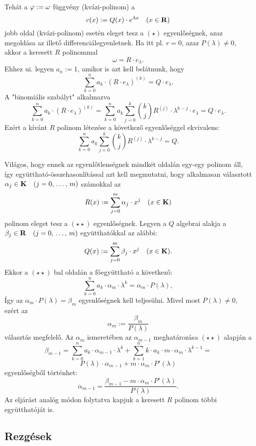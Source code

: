 Tehát  a $\varphi := \omega$ függvény (kvázi-polinom) a
\[
	 c(x) := Q(x) \cdot e^{\lambda x} \quad (x \in \mathbf{R})
\]
jobb oldal (kvázi-polinom) esetén eleget tesz a $(\star)$ egyenlőségnek, azaz megoldása az illető differenciálegyenletnek. Ha itt pl. $r=0$, azaz $P(\lambda) \neq 0$, akkor a keresett $R$ polinommal
\[
	\omega = R \cdot e_\lambda.
\]
Ehhez ui. legyen $a_n := 1$, amikor is azt kell belátnunk, hogy
\[
	\sum_{k=0}^n a_k \cdot (R \cdot e_\lambda)^{(k)} = Q \cdot e_\lambda.
\]
A "binomiális szabályt" alkalmazva
\[
	\sum_{k=0}^n a_k \cdot (R \cdot e_\lambda)^{(k)} = \sum_{k=0}^n a_k \sum_{j=0}^k \binom{k}{j} R^{(j)} \cdot \lambda^{k-j} \cdot e_\lambda = Q \cdot e_\lambda.
\]
Ezért a kívánt $R$ polinom létezése a következő egyenlőséggel ekvivalens:
\begin{equation}
	\sum_{k=0}^n a_k \sum_{j=0}^k \binom{k}{j} R^{(j)} \cdot \lambda^{k-j} = Q.
	\tag{$\star \star$}
\end{equation}

Világos, hogy ennek az egyenlőtlenségnek mindkét oldalán egy-egy polinom áll, így együttható-összehasonlítással azt kell megmutatni, hogy alkalmasan választott $\alpha_j \in \mathbf{K} \quad (j = 0, \, \dots, \, m)$ számokkal az
\[
	R(x) := \sum_{j=0}^m \alpha_j \cdot x^j \quad (x \in \mathbf{K})
\]
polinom eleget tesz a $(\star \star)$ egyenlőségnek. Legyen a $Q$ algebrai alakja a $\beta_j \in \mathbf{R} \quad (j = 0, \, \dots, \, m)$ együtthatókkal az alábbi:
\[
	Q(x) := \sum_{j=0}^m \beta_j \cdot x^j \quad (x \in \mathbf{K}).
\]
Ekkor a $(\star \star)$ bal oldalán a főegyüttható a következő:
\[
	\sum_{k=0}^n a_k \cdot \alpha_m \cdot \lambda^k = \alpha_m \cdot P(\lambda),
\]
Így az $\alpha_m \cdot P(\lambda) = \beta_m$ egyenlőségnek kell teljesülni. Mivel most $P(\lambda) \neq 0$, ezért az
\[
	\alpha_m := \frac{\beta_m}{P(\lambda)}
\]
választás megfelelő. Az $\alpha_m$ ismeretében az $\alpha_{m-1}$ meghatározása $(\star \star)$ alapján a
\[
	\beta_{m-1} = \sum_{k=0}^n a_k \cdot \alpha_{m-1} \cdot \lambda^k + \sum_{k=1}^n k \cdot a_k \cdot m \cdot \alpha_m \cdot \lambda^{k-1} =
\]
\[
	P(\lambda) \cdot \alpha_{m-1} + m \cdot \alpha_m \cdot P'(\lambda)
\]
egyenlőségből történhet:
\[
	\alpha_{m-1} = \frac{\beta_{m-1} - m \cdot \alpha_m \cdot P'(\lambda)}{P(\lambda)}.
\]
Az eljárást analóg módon folytatva kapjuk a keresett $R$ polinom többi együtthatóját is.  

\subsection{Rezgések}

